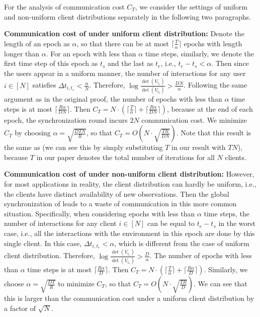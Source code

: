 For the analysis of communication cost $C_{T}$, we consider the settings of uniform and non-uniform client distributions separately in the following two paragraphs.

\noindent \textbf{Communication cost of \modelbaseline{} under uniform client distribution: }
Denote the length of an epoch as $\alpha$, so that there can be at most $\lceil \frac{T}{\alpha}\rceil$ epochs with length longer than $\alpha$.
For an epoch with less than $\alpha$ time steps, similarly, we denote the first time step of this epoch as $t_{s}$ and the last as $t_{e}$, i.e., $t_{e}-t_{s} < \alpha$. Then since the users appear in a uniform manner, the number of interactions for any user $i\in[N]$ satisfies $\Delta t_{i,t_{e}} < \frac{\alpha}{N}$. Therefore, $\log{\frac{\det(V_{t_{e}})}{\det(V_{t_{s}})}} > \frac{D N}{\alpha}$. Following the same argument as in the original proof, the number of epochs with less than $\alpha$ time steps is at most $\lceil \frac{R \alpha}{D N}\rceil$. Then $C_{T}=N \cdot (\lceil \frac{T}{\alpha}\rceil+\lceil \frac{R \alpha}{D N}\rceil)$, because at the end of each epoch, the synchronization round incurs $2N$ communication cost. We minimize $C_{T}$ by choosing $\alpha=\sqrt{\frac{D T N}{R}}$, so that $C_{T}=O(N \cdot \sqrt{\frac{T R}{D N}})$. Note that this result is the same as \cite{wang2019distributed} (we can see this by simply substituting $T$ in our result with $TN$), because $T$ in our paper denotes the total number of iterations for all $N$ clients.

\noindent \textbf{Communication cost of \modelbaseline{} under non-uniform client distribution: }
However, for most applications in reality, the client distribution can hardly be uniform, i.e., the clients have distinct availability of new observations. Then the global synchronization of \modelbaseline{} leads to a waste of communication in this more common situation.
Specifically, when considering epochs with less than $\alpha$ time steps, the number of interactions for any client $i\in[N]$ can be equal to $t_{e}-t_{s}$ in the worst case, i.e., all the interactions with the environment in this epoch are done by this single client. In this case, $\Delta t_{i,t_{e}} < \alpha$, which is different from the case of uniform client distribution.
Therefore, $\log{\frac{\det(V_{t_{e}})}{\det(V_{t_{s}})}} > \frac{D}{\alpha}$. The number of epochs with less than $\alpha$ time steps is at most $\lceil \frac{R \alpha}{D}\rceil$. Then $C_{T}=N \cdot (\lceil \frac{T}{\alpha}\rceil+\lceil \frac{R \alpha}{D}\rceil)$. Similarly, we choose $\alpha=\sqrt{\frac{D T}{R}}$ to minimize $C_{T}$, so that $C_{T}= O(N \cdot\sqrt{\frac{T R}{D}})$. We can see that this is larger than the communication cost under a uniform client distribution by a factor of $\sqrt{N}$.


